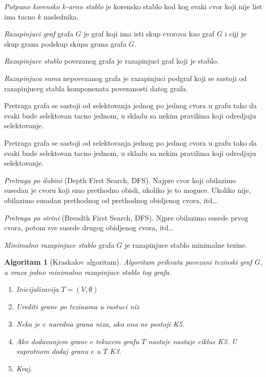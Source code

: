 \documentclass[12p, a4paper]{article}
\newtheorem*{alg}{Algoritam}
\begin{document}
\begin{multicols}{2}
    \emph{Potpuno korensko $k$-arno stablo} je korensko stablo kod kog
    svaki cvor koji nije list ima tacno $k$ naslednika.

    \emph{Razapinjuci graf} grafa $G$ je graf koji ima isti skup cvorova kao
    graf $G$ i ciji je skup grana podskup skupa grana grafa $G$.

    \emph{Razapinjuce stablo} povezanog grafa je razapinjuci graf koji je 
    stablo.

    \emph{Razapinjuca suma} nepovezanog grafa je razapinjuci podgraf koji se
    sastoji od razapinjuceg stabla komponenata povezanosti datog grafa.

    Pretraga grafa se sastoji od selektovanja jednog po jednog cvora u grafu
    tako da svaki bude selektovan tacno jednom, u skladu sa nekim pravilima
    koji odredjuju selektovanje.

    Pretraga grafa se sastoji od selektovanja jednog po jednog cvora u grafu
    tako da svaki bude selektovan tacno jednom, u skladu sa nekim pravilima
    koji odredjuju selektovanje.

    \emph{Pretraga po dubini} (Depth First Search, DFS). 
    Najpre cvor koji obilazimo susedan je cvoru koji smo prethodno obisli,
    ukoliko je to moguce. Ukoliko nije, obilazimo susadan prethodnog od
    prethodnog obidjenog cvora, itd\ldots

    \emph{Pretraga po sirini} (Breadth First Search, DFS).
    Njpre obilazimo susede prvog cvora, potom sve susede drugog 
    obidjenog cvora, itd\ldots

    \emph{Minimalno razapinjuce stablo} grafa $G$ je razapinjuce stablo 
    minimalne tezine.

    \begin{alg}[Kraskalov algoritam]
        Algoritam prihvata povezani tezinski graf $G$, a vraca jedno
        minimalno razapinjuce stablo tog grafa.
        \begin{enumerate}
            \itemsep0em
            \item [K1] Inicijalizavija $T = (V, \emptyset)$
            \item [K2] Urediti grane po tezinama u rastuci niz
            \item [K3] Neka je $e$ naredna grana niza, ako ona ne postoji K5.
            \item [K4] Ako dodavanjem grane $e$ tekucem grafu $T$ nastaje
                       nastaje ciklus K3. U suprotnom dodaj granu $e$ u $T$ K3.
            \item [K5] Kraj.
        \end{enumerate}
    \end{alg}


\end{multicols}
\end{document}

